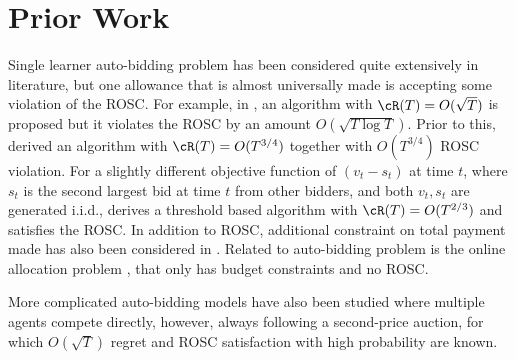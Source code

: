\section{Prior Work}
Single learner auto-bidding problem has been considered quite extensively in literature, but one allowance that is almost universally made is accepting some violation of the ROSC. For example, in \cite{Feng}, an algorithm with $\cR(T) = O(\sqrt{T})$ is proposed but it violates the ROSC by an amount  $O(\sqrt{T\log T})$. Prior to this, \cite{castiglioni2022unifying} derived an algorithm with $\cR(T) =O(T^{3/4})$ together with $O(T^{3/4})$ ROSC violation. For a slightly different objective function of $(v_t-s_t)$ at time $t$, where $s_t$ is the second largest bid at time $t$ from other bidders, and both $v_t,s_t$ are generated i.i.d., \cite{golrezaei2021bidding} derives a threshold based algorithm with $\cR(T) = O(T^{2/3})$ and satisfies the ROSC. In addition to ROSC, additional constraint on total payment made 
has also been considered in \cite{Feng, castiglioni2022unifying, golrezaei2021bidding}. 
Related to auto-bidding problem is the online allocation problem \cite{balseiro2020dual}, that only has budget constraints and no ROSC.


More complicated auto-bidding models \cite{borgs2007dynamics, golrezaei2021auction, chen2023complexity, lucier2024autobidders} 
have also been studied where multiple agents compete directly, however, always following a second-price auction, for which $O(\sqrt{T})$ regret and ROSC satisfaction with high probability are known. 


\vspace{-0.1in}